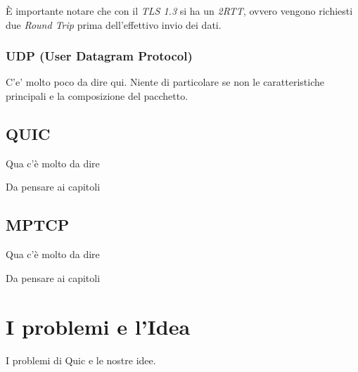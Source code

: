 \noindent È importante notare che con il \emph{TLS 1.3} si ha un \emph{2RTT}, ovvero vengono richiesti due \emph{Round Trip} prima dell'effettivo invio dei dati. 

\subsubsection{UDP (User Datagram Protocol)}

C'e' molto poco da dire qui. Niente di particolare se non le caratteristiche principali e la composizione del pacchetto. 

\subsection{QUIC}

Qua c'è molto da dire

Da pensare ai capitoli 

\subsection{MPTCP}

Qua c'è molto da dire

Da pensare ai capitoli 

\section{I problemi e l'Idea}

I problemi di Quic e le nostre idee.


